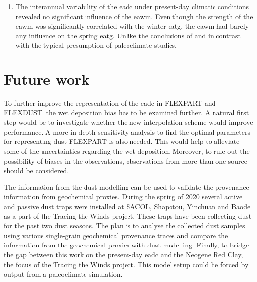 \begin{enumerate}
    \item The interannual variability of the \acrshort{eadc} under present-day climatic conditions revealed no significant influence of the \acrshort{eawm}. Even though the strength of the \acrshort{eawm} was significantly correlated with the winter \acrshort{eatg}, the \acrshort{eawm} had barely any influence on the spring \acrshort{eatg}.
    Unlike the conclusions of \textcite{wyrwoll2016cold} and in contrast with the typical presumption of paleoclimate studies.

\end{enumerate}

 

\section{Future work}
To further improve the representation of the \acrshort{eadc} in FLEXPART and FLEXDUST, the wet deposition bias has to be examined further. A natural first step would be to investigate whether the new interpolation scheme would improve performance. A more in-depth sensitivity analysis to find the optimal parameters for representing dust FLEXPART is also needed. This would help to alleviate some of the uncertainties regarding the wet deposition. Moreover, to rule out the possibility of biases in the observations, observations from more than one source should be considered.  
  
The information from the dust modelling can be used to validate the provenance information from geochemical proxies. 
During the spring of 2020 several active and passive dust traps were installed at SACOL, Shapotou, Yinchuan and Baode as a part of the Tracing the Winds project. These traps have been collecting dust for the past two dust seasons. The plan is to analyse the collected dust samples using various single-grain geochemical provenance traces and compare the information from the geochemical proxies with dust modelling. Finally, to bridge the gap between this work on the present-day \acrshort{eadc} and the Neogene Red Clay, the focus of the Tracing the Winds project. This model setup could be forced by output from a paleoclimate simulation.





